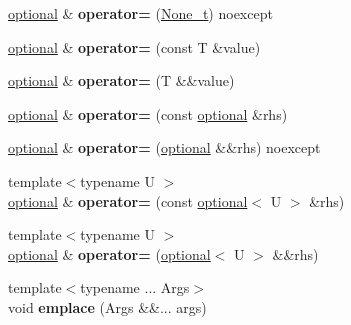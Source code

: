 \begin{DoxyCompactItemize}
\hyperlink{classmcurses_1_1optional}{optional} \& {\bfseries operator=} (\hyperlink{classmcurses_1_1None__t}{None\+\_\+t}) noexcept
\item 
\hypertarget{classmcurses_1_1optional_a636035e6a854bb0093fb12373a876bf1}{}\label{classmcurses_1_1optional_a636035e6a854bb0093fb12373a876bf1} 
\hyperlink{classmcurses_1_1optional}{optional} \& {\bfseries operator=} (const T \&value)
\item 
\hypertarget{classmcurses_1_1optional_aa78883a564b27d0dfe7b9cb6942e4f4f}{}\label{classmcurses_1_1optional_aa78883a564b27d0dfe7b9cb6942e4f4f} 
\hyperlink{classmcurses_1_1optional}{optional} \& {\bfseries operator=} (T \&\&value)
\item 
\hypertarget{classmcurses_1_1optional_a11a6b4492251b945432ea9d5249153dd}{}\label{classmcurses_1_1optional_a11a6b4492251b945432ea9d5249153dd} 
\hyperlink{classmcurses_1_1optional}{optional} \& {\bfseries operator=} (const \hyperlink{classmcurses_1_1optional}{optional} \&rhs)
\item 
\hypertarget{classmcurses_1_1optional_a73b789bdc02066f3b4f6e3193517921a}{}\label{classmcurses_1_1optional_a73b789bdc02066f3b4f6e3193517921a} 
\hyperlink{classmcurses_1_1optional}{optional} \& {\bfseries operator=} (\hyperlink{classmcurses_1_1optional}{optional} \&\&rhs) noexcept
\item 
\hypertarget{classmcurses_1_1optional_a086160caca323662510b8e93f188c45b}{}\label{classmcurses_1_1optional_a086160caca323662510b8e93f188c45b} 
{\footnotesize template$<$typename U $>$ }\\\hyperlink{classmcurses_1_1optional}{optional} \& {\bfseries operator=} (const \hyperlink{classmcurses_1_1optional}{optional}$<$ U $>$ \&rhs)
\item 
\hypertarget{classmcurses_1_1optional_acdf547561696fa58fa9691c26b069bd5}{}\label{classmcurses_1_1optional_acdf547561696fa58fa9691c26b069bd5} 
{\footnotesize template$<$typename U $>$ }\\\hyperlink{classmcurses_1_1optional}{optional} \& {\bfseries operator=} (\hyperlink{classmcurses_1_1optional}{optional}$<$ U $>$ \&\&rhs)
\item 
\hypertarget{classmcurses_1_1optional_a50d5f9a51f0c9cffa0047104a8a5b4dc}{}\label{classmcurses_1_1optional_a50d5f9a51f0c9cffa0047104a8a5b4dc} 
{\footnotesize template$<$typename ... Args$>$ }\\void {\bfseries emplace} (Args \&\&... args)
\item 
\hypertarget{classmcurses_1_1optional_afec44c75b5b1c8d35ffc3bdb17b5f859}{}\label{classmcurses_1_1optional_afec44c75b5b1c8d35ffc3bdb17b5f859} 

\end{DoxyCompactItemize}

